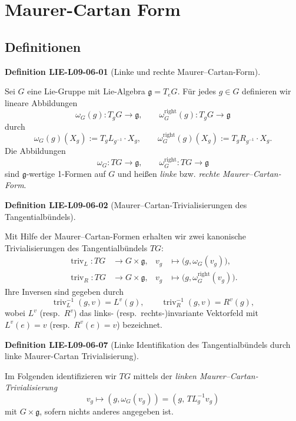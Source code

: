 \documentclass[10pt, letterpaper]{article}
\newcommand{\CustomHeading}[3]{%
  \par\medskip\noindent%
  \textbf{#1 #2} \textnormal{(#3)}.\enskip%
}
\newenvironment{DEF}[2]{\CustomHeading{Definition}{#1}{#2}}{}
\begin{document}
\section{Maurer-Cartan Form}

\subsection{Definitionen}

\begin{DEF}{LIE-L09-06-01}{Linke und rechte Maurer--Cartan-Form}
Sei $G$ eine Lie-Gruppe mit Lie-Algebra $\mathfrak g=T_eG$.
Für jedes $g\in G$ definieren wir lineare Abbildungen
\[
\omega_G(g):T_gG\longrightarrow\mathfrak g,
\qquad
\omega_G^{\mathrm{right}}(g):T_gG\longrightarrow\mathfrak g
\]
durch
\[
\omega_G(g)(X_g):=T_gL_{g^{-1}}\cdot X_g,
\qquad
\omega_G^{\mathrm{right}}(g)(X_g):=T_gR_{g^{-1}}\cdot X_g.
\]
Die Abbildungen
\[
\omega_G:T G\longrightarrow\mathfrak g,\qquad
\omega_G^{\mathrm{right}}:T G\longrightarrow\mathfrak g
\]
sind $\mathfrak g$-wertige 1-Formen auf $G$ und heißen
\emph{linke} bzw. \emph{rechte Maurer--Cartan-Form}.
\end{DEF}

\begin{DEF}{LIE-L09-06-02}{Maurer--Cartan-Trivialisierungen des Tangentialbündels}
Mit Hilfe der Maurer--Cartan-Formen erhalten wir zwei kanonische
Trivialisierungen des Tangentialbündels $T G$:
\[
\begin{aligned}
\operatorname{triv}_L:T G&\longrightarrow G\times\mathfrak g,&
v_g&\longmapsto\bigl(g,\omega_G(v_g)\bigr),\\
\operatorname{triv}_R:T G&\longrightarrow G\times\mathfrak g,&
v_g&\longmapsto\bigl(g,\omega_G^{\mathrm{right}}(v_g)\bigr).
\end{aligned}
\]
Ihre Inversen sind gegeben durch
\[
\operatorname{triv}_L^{-1}(g,v)=L^v(g),\qquad
\operatorname{triv}_R^{-1}(g,v)=R^v(g),
\]
wobei $L^v$ (resp.\ $R^v$) das links- (resp.\ rechts-)invariante
Vektorfeld mit $L^v(e)=v$ (resp.\ $R^v(e)=v$) bezeichnet.
\end{DEF}

\begin{DEF}{LIE-L09-06-07}{Linke Identifikation des Tangentialbündels durch linke Maurer-Cartan Trivialisierung}
Im Folgenden identifizieren wir $T G$ mittels der \emph{linken
Maurer--Cartan-Trivialisierung}
\[
v_g\longmapsto(g,\omega_G(v_g))=(g,\,T L_g^{-1}v_g)
\]
mit $G\times\mathfrak g$, sofern nichts anderes angegeben ist.
\end{DEF}
\end{document}
